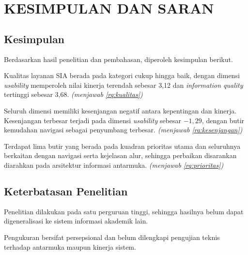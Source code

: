 %

\chapter{KESIMPULAN DAN SARAN}

\section{Kesimpulan}
Berdasarkan hasil penelitian dan pembahasan, diperoleh kesimpulan berikut.

\begin{daftarnomor}
    \item Kualitas layanan SIA berada pada kategori cukup hingga baik, dengan
          dimensi \textit{usability} memperoleh nilai kinerja terendah sebesar
          3,12 dan \textit{information quality} tertinggi sebesar 3,68.
          \emph{(menjawab \cref{rq:kualitas})}
    \item Seluruh dimensi memiliki kesenjangan negatif antara kepentingan dan
          kinerja. Kesenjangan terbesar terjadi pada dimensi \textit{usability}
          sebesar $-1{,}29$, dengan butir kemudahan navigasi sebagai
          penyumbang terbesar. \emph{(menjawab \cref{rq:kesenjangan})}
    \item Terdapat lima butir yang berada pada kuadran prioritas utama dan
          seluruhnya berkaitan dengan navigasi serta kejelasan alur, sehingga
          perbaikan disarankan diarahkan pada arsitektur informasi antarmuka.
          \emph{(menjawab \cref{rq:prioritas})}
\end{daftarnomor}

\section{Keterbatasan Penelitian}

\begin{daftarnomor}
    \item Penelitian dilakukan pada satu perguruan tinggi, sehingga hasilnya
          belum dapat digeneralisasi ke sistem informasi akademik lain.
    \item Pengukuran bersifat persepsional dan belum dilengkapi pengujian
          teknis terhadap antarmuka maupun kinerja sistem.
\end{daftarnomor}

